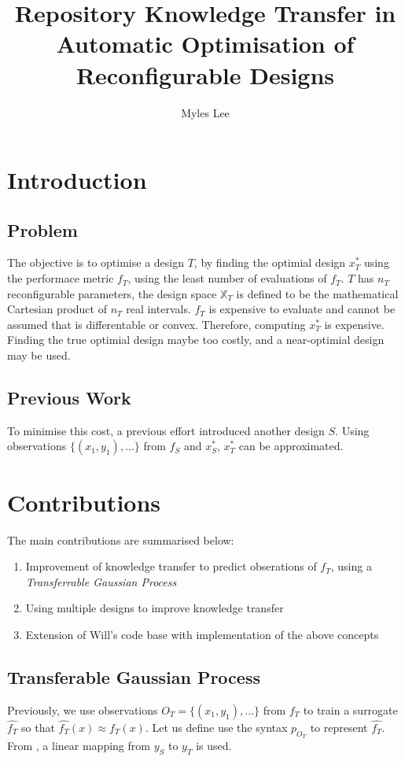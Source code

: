 \documentclass[10pt,a4paper]{article}
\author{Myles Lee}
\title{Repository Knowledge Transfer in Automatic Optimisation of
Reconfigurable Designs}
\begin{document}
\maketitle
\section*{Introduction}
\subsection*{Problem}
The objective is to optimise a design $T$, by finding the optimial design $x_T^*$ using the performace metric $f_T$, using the least number of evaluations of $f_T$. $T$ has $n_T$ reconfigurable parameters, the design space $\mathbb{X}_T$ is defined to be the mathematical Cartesian product of $n_T$ real intervals. $f_T$ is expensive to evaluate and cannot be assumed that is differentable or convex. Therefore, computing $x_T^*$ is expensive. Finding the true optimial design maybe too costly, and a near-optimial design may be used.
\subsection*{Previous Work}
To minimise this cost, a previous effort \cite{ego} introduced another design $S$. Using observations $\{(x_1,y_1),...\}$ from $f_S$ and $x_S^*$, $x_T^*$ can be approximated.
\section*{Contributions}
The main contributions are summarised below:
\begin{enumerate}
\item Improvement of knowledge transfer to predict obserations of $f_T$, using a \emph{Transferrable Gaussian Process}
\item Using multiple designs to improve knowledge transfer
\item Extension of Will's code base with implementation of the above concepts
\end{enumerate}
\subsection*{Transferable Gaussian Process}
Previously, we use observations $O_T=\{(x_1,y_1),...\}$ from $f_T$ to train a surrogate $\hat{f_T}$ so that $\hat{f_T}(x)\approx f_T(x)$. Let us define use the syntax $p_{O_T}$ to represent $\hat{f_T}$. From \cite{ego}, a linear mapping from $y_S$ to $y_T$ is used.
\end{document}
